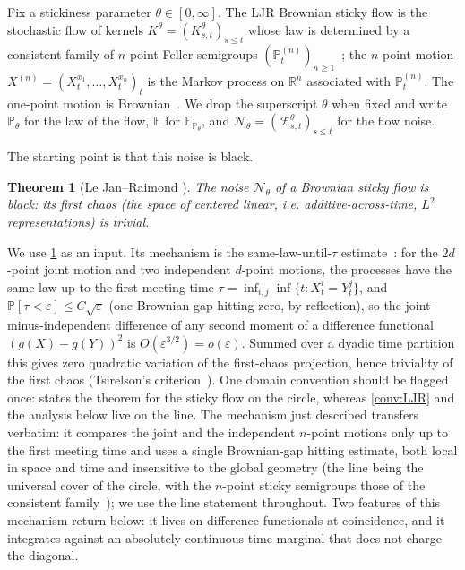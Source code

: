 \documentclass[reqno,final,11pt]{amsart}
\theoremstyle{plain}
\newtheorem{theorem}{Theorem}[section]
\theoremstyle{definition}
\theoremstyle{remark}
\newcommand{\R}{\mathbb R}
\newcommand{\E}{\mathbb E}
\newcommand{\Prob}{\mathbb P}
\newcommand{\cF}{\mathcal F}
\newcommand{\cN}{\mathcal N}
\newcommand{\Pth}{\Prob_{\theta}}
\begin{document}
Fix a stickiness parameter $\theta\in[0,\infty]$. The LJR Brownian sticky
flow is the stochastic flow of kernels $K^{\theta}=(K^{\theta}_{s,t})_{s\le t}$
whose law is determined by a consistent family of $n$-point Feller
semigroups $(\Prob^{(n)}_t)_{n\ge1}$~\citep[Thm.~2.1, \S2]{LJR-FCN}; the
$n$-point motion $X^{(n)}=(X^{x_1}_t,\dots,X^{x_n}_t)_t$ is the Markov
process on $\R^n$ associated with $\Prob^{(n)}_t$. The one-point motion is
Brownian~\citep{LJR-circle-noise}. We drop the superscript $\theta$ when fixed
and write $\Pth$ for the law of the flow, $\E$ for $\E_{\Pth}$, and
$\cN_\theta=(\cF^{\theta}_{s,t})_{s\le t}$ for the flow noise.

The starting point is that this noise is black.

\begin{theorem}[Le Jan--Raimond {\citep{LJR-circle-noise}}]\label{thm:black}
The noise $\cN_\theta$ of a Brownian sticky flow is black: its first chaos
(the space of centered linear, i.e. additive-across-time, $L^2$
representations) is trivial.
\end{theorem}
We use \cref{thm:black} as an input. Its mechanism is the
same-law-until-$\tau$ estimate~\citep{LJR-circle-noise}: for the $2d$-point
joint motion and two independent $d$-point motions, the processes have the
same law up to the first meeting time
$\tau=\inf_{i,j}\inf\{t:X^i_t=Y^j_t\}$, and
$\Prob[\tau<\varepsilon]\le C\sqrt{\varepsilon}$ (one Brownian gap hitting
zero, by reflection), so the joint-minus-independent difference of any
second moment of a difference functional $(g(X)-g(Y))^2$ is
$O(\varepsilon^{3/2})=o(\varepsilon)$. Summed over a dyadic time partition
this gives zero quadratic variation of the first-chaos projection, hence
triviality of the first chaos (Tsirelson's
criterion~\citep{Tsirelson-StFlour,Tsirelson-Survey}). One domain convention
should be flagged once: \citep{LJR-circle-noise} states the theorem for the
sticky flow on the circle, whereas \cref{conv:LJR} and the analysis below live
on the line. The mechanism just described transfers verbatim: it compares the
joint and the independent $n$-point motions only up to the first meeting time
and uses a single Brownian-gap hitting estimate, both local in space and time
and insensitive to the global geometry (the line being the universal cover of
the circle, with the $n$-point sticky semigroups those of the consistent
family~\citep{LJR-FCN}); we use the line statement throughout. Two features of this
mechanism return below: it lives on difference functionals at
coincidence, and it integrates against an absolutely continuous time
marginal that does not charge the diagonal.
\end{document}
